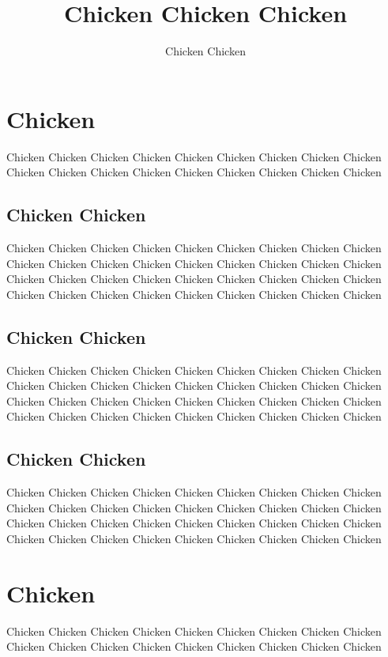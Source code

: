 \documentclass[11pt]{article} %
\title{Chicken Chicken Chicken}
\author{Chicken Chicken}
\begin{document}
\maketitle

\section{Chicken}

Chicken Chicken Chicken Chicken Chicken Chicken Chicken Chicken Chicken Chicken Chicken Chicken Chicken Chicken Chicken Chicken Chicken Chicken 

\subsection{Chicken Chicken}

Chicken Chicken Chicken Chicken Chicken Chicken Chicken Chicken Chicken Chicken Chicken Chicken Chicken Chicken Chicken Chicken Chicken Chicken Chicken Chicken Chicken Chicken Chicken Chicken Chicken Chicken Chicken Chicken Chicken Chicken Chicken Chicken Chicken Chicken Chicken Chicken 

\subsection{Chicken Chicken}

Chicken Chicken Chicken Chicken Chicken Chicken Chicken Chicken Chicken Chicken Chicken Chicken Chicken Chicken Chicken Chicken Chicken Chicken Chicken Chicken Chicken Chicken Chicken Chicken Chicken Chicken Chicken Chicken Chicken Chicken Chicken Chicken Chicken Chicken Chicken Chicken 

\subsection{Chicken Chicken}

Chicken Chicken Chicken Chicken Chicken Chicken Chicken Chicken Chicken Chicken Chicken Chicken Chicken Chicken Chicken Chicken Chicken Chicken Chicken Chicken Chicken Chicken Chicken Chicken Chicken Chicken Chicken Chicken Chicken Chicken Chicken Chicken Chicken Chicken Chicken Chicken 

\section{Chicken}

Chicken Chicken Chicken Chicken Chicken Chicken Chicken Chicken Chicken Chicken Chicken Chicken Chicken Chicken Chicken Chicken Chicken Chicken 
\end{document}
